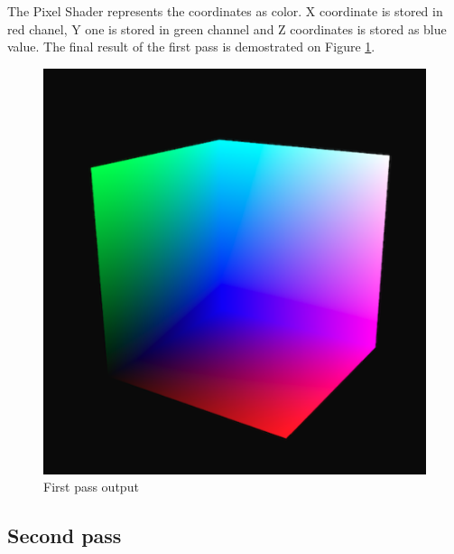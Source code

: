 \documentclass[twoside, english, 11pt]{report}
\begin{document}
The Pixel Shader represents the coordinates as color. X coordinate is stored in red chanel, Y one is stored in green channel and Z coordinates is stored as blue value. The final result of the first pass is demostrated on Figure \ref{fig:first}.
\begin{figure}[!h]
\centerline{\includegraphics[scale = 0.5]{img/first}}
\caption{First pass output\label{fig:first}}
\end{figure}

\subsection{Second pass}
\end{document}
